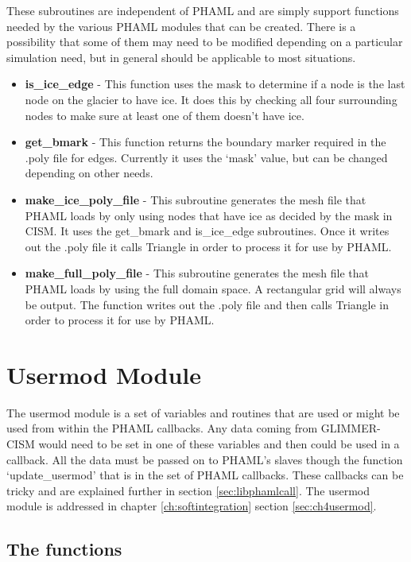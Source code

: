 These subroutines are independent of PHAML and are simply support functions needed by the various PHAML modules that can be created.  There is a possibility that some of them may need to be modified depending on a particular simulation need, but in general should be applicable to most situations.

\begin{itemize}
\item \textbf{is\_ice\_edge} - This function uses the mask to determine if a node is the last node on the glacier to have ice.  It does this by checking all four surrounding nodes to make sure at least one of them doesn't have ice. 
\item \textbf{get\_bmark} - This function returns the boundary marker required in the .poly file for edges.  Currently it uses the `mask' value, but can be changed depending on other needs.
\item \textbf{make\_ice\_poly\_file} - This subroutine generates the mesh file that PHAML loads by only using nodes that have ice as decided by the mask in CISM.  It uses the get\_bmark and is\_ice\_edge subroutines.  Once it writes out the .poly file it calls Triangle in order to process it for use by PHAML.  
\item \textbf{make\_full\_poly\_file} - This subroutine generates the mesh file that PHAML loads by using the full domain space.  A rectangular grid will always be output.  The function writes out the .poly file and then calls Triangle in order to process it for use by PHAML.  
\end{itemize}

\section{Usermod Module}\label{sec:libfuncuser}

The usermod module is a set of variables and routines that are used or might be used from within the PHAML callbacks.  Any data coming from GLIMMER-CISM would need to be set in one of these variables and then could be used in a callback.  All the data must be passed on to PHAML's slaves though the function `update\_usermod' that is in the set of PHAML callbacks.  These callbacks can be tricky and are explained further in section \ref{sec:libphamlcall}.  The usermod module is addressed in chapter \ref{ch:softintegration} section \ref{sec:ch4usermod}.

\subsection{The functions}

